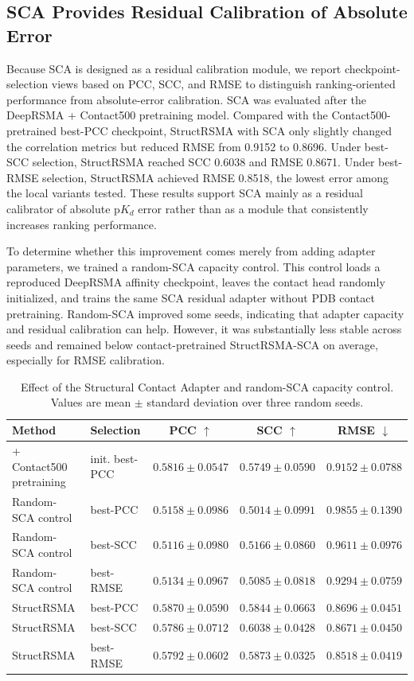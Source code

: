 \documentclass[journal=jcisd8,manuscript=article]{achemso}
\begin{document}
\subsection{SCA Provides Residual Calibration of Absolute Error}

Because SCA is designed as a residual calibration module, we report checkpoint-selection views based on PCC, SCC, and RMSE to distinguish ranking-oriented performance from absolute-error calibration. SCA was evaluated after the DeepRSMA + Contact500 pretraining model. Compared with the Contact500-pretrained best-PCC checkpoint, StructRSMA with SCA only slightly changed the correlation metrics but reduced RMSE from 0.9152 to 0.8696. Under best-SCC selection, StructRSMA reached SCC 0.6038 and RMSE 0.8671. Under best-RMSE selection, StructRSMA achieved RMSE 0.8518, the lowest error among the local variants tested. These results support SCA mainly as a residual calibrator of absolute p$K_d$ error rather than as a module that consistently increases ranking performance.

To determine whether this improvement comes merely from adding adapter parameters, we trained a random-SCA capacity control. This control loads a reproduced DeepRSMA affinity checkpoint, leaves the contact head randomly initialized, and trains the same SCA residual adapter without PDB contact pretraining. Random-SCA improved some seeds, indicating that adapter capacity and residual calibration can help. However, it was substantially less stable across seeds and remained below contact-pretrained StructRSMA-SCA on average, especially for RMSE calibration.

\begin{table}[t]
\centering
\caption{Effect of the Structural Contact Adapter and random-SCA capacity control. Values are mean $\pm$ standard deviation over three random seeds.}
\label{tab:sca_results}
\small
\setlength{\tabcolsep}{3pt}
\begin{tabular}{llccc}
\toprule
Method & Selection & PCC $\uparrow$ & SCC $\uparrow$ & RMSE $\downarrow$ \\
\midrule
+ Contact500 pretraining & init. best-PCC & $0.5816 \pm 0.0547$ & $0.5749 \pm 0.0590$ & $0.9152 \pm 0.0788$ \\
Random-SCA control & best-PCC & $0.5158 \pm 0.0986$ & $0.5014 \pm 0.0991$ & $0.9855 \pm 0.1390$ \\
Random-SCA control & best-SCC & $0.5116 \pm 0.0980$ & $0.5166 \pm 0.0860$ & $0.9611 \pm 0.0976$ \\
Random-SCA control & best-RMSE & $0.5134 \pm 0.0967$ & $0.5085 \pm 0.0818$ & $0.9294 \pm 0.0759$ \\
StructRSMA & best-PCC & $0.5870 \pm 0.0590$ & $0.5844 \pm 0.0663$ & $0.8696 \pm 0.0451$ \\
StructRSMA & best-SCC & $0.5786 \pm 0.0712$ & $0.6038 \pm 0.0428$ & $0.8671 \pm 0.0450$ \\
StructRSMA & best-RMSE & $0.5792 \pm 0.0602$ & $0.5873 \pm 0.0325$ & $0.8518 \pm 0.0419$ \\
\bottomrule
\end{tabular}
\end{table}
\end{document}
